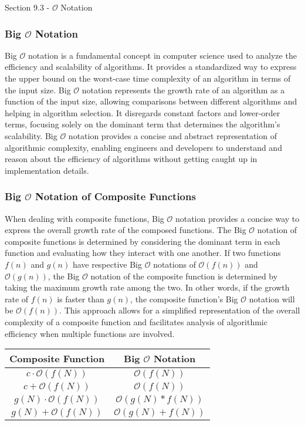 \begin{notes}{Section 9.3 - $\mathcal{O}$ Notation}
    \subsubsection*{Big $\mathcal{O}$ Notation}

    Big $\mathcal{O}$ notation is a fundamental concept in computer science used to analyze the efficiency and scalability of algorithms. It provides a standardized way to express the upper bound on the worst-case time complexity of an algorithm in terms of the input size. Big $\mathcal{O}$ notation represents the growth rate of an algorithm as a function of the input size, allowing comparisons between different algorithms 
    and helping in algorithm selection. It disregards constant factors and lower-order terms, focusing solely on the dominant term that determines the algorithm's scalability. Big $\mathcal{O}$ notation provides a concise and abstract representation of algorithmic complexity, enabling engineers and developers to understand and reason about the efficiency of algorithms without getting caught up in implementation details.
    
    \subsubsection*{Big $\mathcal{O}$ Notation of Composite Functions}
    
    When dealing with composite functions, Big $\mathcal{O}$ notation provides a concise way to express the overall growth rate of the composed functions. The Big $\mathcal{O}$ notation of composite functions is determined by considering the dominant term in each function and evaluating how they interact with one another. If two functions $f(n)$ and $g(n)$ have respective Big $\mathcal{O}$ notations of $\mathcal{O}(f(n))$ and 
    $\mathcal{O}(g(n))$, the Big $\mathcal{O}$ notation of the composite function is determined by taking the maximum growth rate among the two. In other words, if the growth rate of $f(n)$ is faster than $g(n)$, the composite function's Big $\mathcal{O}$ notation will be $\mathcal{O}(f(n))$. This approach allows for a simplified representation of the overall complexity of a composite function and facilitates analysis of algorithmic 
    efficiency when multiple functions are involved.
    
    \begin{center}
        \begin{tabular}{|c|c|}
            \hline Composite Function & Big $\mathcal{O}$ Notation \\ \hline
            $c \cdot \mathcal{O}(f(N))$ & $\mathcal{O}(f(N))$ \\ \hline
            $c + \mathcal{O}(f(N))$ & $\mathcal{O}(f(N))$ \\ \hline
            $g(N) \cdot \mathcal{O}(f(N))$ & $\mathcal{O}(g(N)*f(N))$ \\ \hline
            $g(N) + \mathcal{O}(f(N))$ & $\mathcal{O}(g(N) + f(N))$ \\ \hline
        \end{tabular}
    \end{center}
    

\end{notes}
